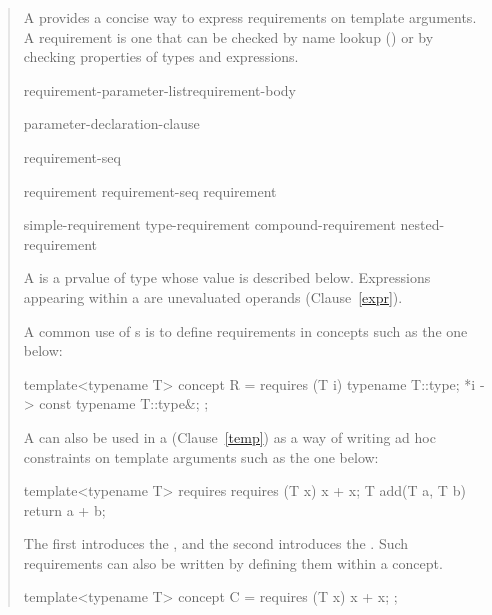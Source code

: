 \begin{quote}
\begin{addedblock}

\pnum
A  provides a concise way to express 
requirements on template arguments. 
% 
A requirement is one that can be checked by name lookup
() or by checking properties of types and expressions.

\begin{bnf}
\br
     requirement-parameter-list\opt requirement-body

\br
    \terminal{(} parameter-declaration-clause\opt~\terminal{)}
  
\br
    \terminal{\{} requirement-seq \terminal{\}}

\br
    requirement\br
    requirement-seq requirement

\br
    simple-requirement\br
    type-requirement\br
    compound-requirement\br
    nested-requirement
\end{bnf}

\pnum
A  is a prvalue of type  whose
value is described below.
Expressions appearing within a 
are unevaluated operands (Clause~\ref{expr}).

\pnum
\enterexample
A common use of s is to define
requirements in concepts such as the one below:
\begin{codeblock}
template<typename T>
  concept R = requires (T i) {
    typename T::type;
    {*i} -> const typename T::type&;
  };
\end{codeblock}
A  can also be used in a 
 (Clause~\ref{temp}) as a way of writing ad hoc 
constraints on template arguments such as the one below:
\begin{codeblock}
template<typename T>
  requires requires (T x) { x + x; }
    T add(T a, T b) { return a + b; }
\end{codeblock}
The first  introduces the 
, and the second
introduces the .
\exitexample
\enternote
Such requirements can also be written by defining them within
a concept.
\begin{codeblock}
template<typename T>
  concept C = requires (T x) { x + x; };


\end{codeblock}
\end{addedblock}
\end{quote}
